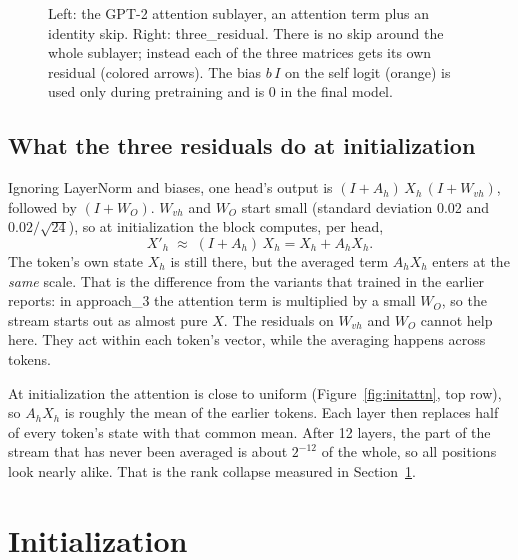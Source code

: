 \documentclass[11pt]{article}
\newcommand{\tr}{three\_residual}
\begin{document}
\begin{figure}[H]
{}
\caption{Left: the GPT-2 attention sublayer, an attention term plus an identity skip. Right: \tr{}. There is no
skip around the whole sublayer; instead each of the three matrices gets its own residual (colored arrows).
The bias $b\,I$ on the self logit (orange) is used only during pretraining and is 0 in the final model.}
\label{fig:arch}
\end{figure}

\subsection{What the three residuals do at initialization}
Ignoring LayerNorm and biases, one head's output is $(I + A_h)\,X_h\,(I + W_{vh})$, followed by $(I + W_O)$.
$W_{vh}$ and $W_O$ start small (standard deviation 0.02 and $0.02/\sqrt{24}$), so at initialization the block
computes, per head,
\[
X'_h \;\approx\; (I + A_h)\,X_h = X_h + A_h X_h .
\]
The token's own state $X_h$ is still there, but the averaged term $A_hX_h$ enters at the \emph{same} scale.
That is the difference from the variants that trained in the earlier reports: in approach\_3 the attention
term is multiplied by a small $W_O$, so the stream starts out as almost pure $X$. The residuals on $W_{vh}$ and
$W_O$ cannot help here. They act within each token's vector, while the averaging happens across tokens.

At initialization the attention is close to uniform (Figure~\ref{fig:initattn}, top row), so $A_hX_h$ is roughly
the mean of the earlier tokens. Each layer then replaces half of every token's state with that common mean.
After 12 layers, the part of the stream that has never been averaged is about $2^{-12}$ of the whole, so all
positions look nearly alike. That is the rank collapse measured in Section~\ref{sec:init}.

\section{Initialization}\label{sec:init}
\end{document}
